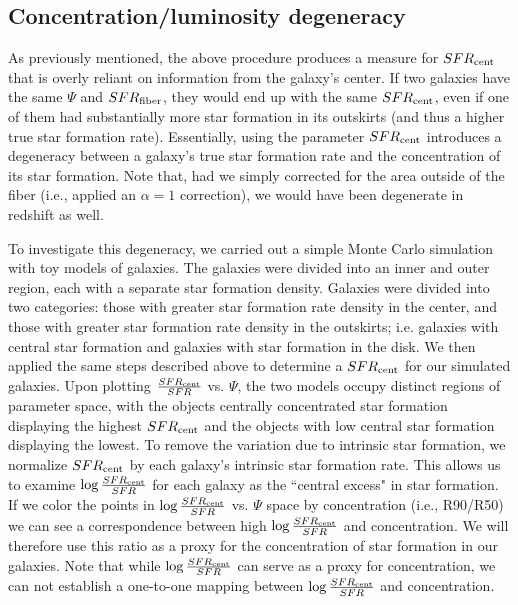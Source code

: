 \documentclass[iop]{emulateapj}
\begin{document}
\subsection{Concentration/luminosity degeneracy}
\label{sec:concdep}
As previously mentioned, the above procedure produces a measure for $SFR_{\rm cent}$ that is overly reliant on information from the galaxy's center. If two galaxies have the same $\Psi$ and $SFR_{\rm fiber}$, they would end up with the same $SFR_{\rm cent}$, even if one of them had substantially more star formation in its outskirts (and thus a higher true star formation rate). Essentially, using the parameter $SFR_{\rm cent}$ introduces a degeneracy between a galaxy's true star formation rate and the concentration of its star formation. Note that, had we simply corrected for the area outside of the fiber (i.e., applied an $\alpha= 1$ correction), we would have been degenerate in redshift as well.

To investigate this degeneracy, we carried out a simple Monte Carlo simulation with toy models of galaxies. The galaxies were divided into an inner and outer region, each with a separate star formation density. Galaxies were divided into two categories: those with greater star formation rate density in the center, and those with greater star formation rate density in the outskirts; i.e. galaxies with central star formation and galaxies with star formation in the disk. We then applied the same steps described above to determine a $SFR_{\rm cent}$ for our simulated galaxies. Upon plotting $\frac{SFR_{\rm cent}}{SFR}$ vs. $\Psi$, the two models occupy distinct regions of parameter space, with the objects centrally concentrated star formation displaying the highest $SFR_{\rm cent}$ and the objects with low central star formation displaying the lowest. To remove the variation due to intrinsic star formation, we normalize $SFR_{\rm cent}$ by each galaxy's intrinsic star formation rate. This allows us to examine $ \log \frac{SFR_{\rm cent}}{SFR}$ for each galaxy as the ``central excess" in star formation. If we color the points in $ \log \frac{SFR_{\rm cent}}{SFR}$ vs. $\Psi$ space by concentration (i.e., R90/R50) we can see a correspondence between high $\log \frac{SFR_{\rm cent}}{SFR}$ and concentration. We will therefore use this ratio as a proxy for the concentration of star formation in our galaxies. Note that while $\log \frac{SFR_{\rm cent}}{SFR}$ can serve as a proxy for concentration, we can not establish a one-to-one mapping between $\log \frac{SFR_{\rm cent}}{SFR}$ and concentration. 
\end{document}
